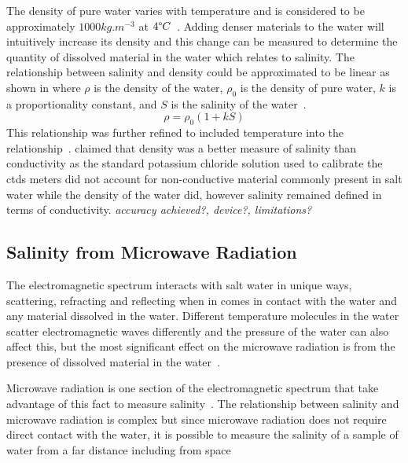 The density of pure water varies with temperature and is considered to be approximately $1000 kg.m^{-3}$ at $4\degree C$~\cite{USGS_water_density_2018}.
Adding denser materials to the water will intuitively increase its density and this change can be measured to determine the quantity of dissolved material in the water which relates to salinity.
The relationship between salinity and density could be approximated to be linear as shown in  where $\rho$ is the density of the water, $\rho_0$ is the density of pure water, $k$ is a proportionality constant, and $S$ is the salinity of the water~\cite{kjerfve_salinity_measurement_overview_1983}\cite{uow_oceanography_research_1966}.
\begin{equation}\label{eq:salinity-density}
    \rho = \rho_0(1 + kS)
\end{equation}
This relationship was further refined to included temperature into the relationship~\cite{schmidt_density_salinity_relation_2018}.
 claimed that density was a better measure of salinity than conductivity as the standard potassium chloride solution used to calibrate the \glspl{ctd} meters did not account for non-conductive material commonly present in salt water while the density of the water did, however salinity remained defined in terms of conductivity.
\textit{accuracy achieved?, device?, limitations?} 

\subsection{Salinity from Microwave Radiation}

The electromagnetic spectrum interacts with salt water in unique ways, scattering, refracting and reflecting when in comes in contact with the water and any material dissolved in the water.
Different temperature molecules in the water scatter electromagnetic waves differently and the pressure of the water can also affect this, but the most significant effect on the microwave radiation is from the presence of dissolved material in the water~\cite{swift_considerations_for_microwave_salinity_1983}.

Microwave radiation is one section of the electromagnetic spectrum that take advantage of this fact to measure salinity~\cite{swift_considerations_for_microwave_salinity_1983}.
The relationship between salinity and microwave radiation is complex but since microwave radiation does not require direct contact with the water, it is possible to measure the salinity of a sample of water from a far distance including from space~\cite{gabarro_microwave_salinity_2004}

